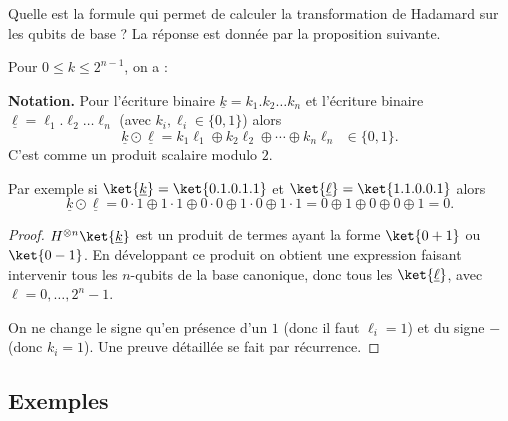 \documentclass[11pt,class=report,crop=false]{standalone}
\begin{document}
Quelle est la formule qui permet de calculer la transformation de Hadamard sur les qubits de base ?
La réponse est donnée par la proposition suivante.

\begin{proposition}
Pour $0 \le k \le 2^{n-1}$, on a :
\end{proposition}

\textbf{Notation.}
Pour l'écriture binaire $\underline{k} = k_1.k_2 \ldots k_n$ et l'écriture binaire
$\underline{\ell} = \ell_1.\ell_2 \ldots \ell_n$ (avec $k_i,\ell_i \in \{0,1\}$) alors
$$\underline{k} \odot \underline{\ell} = k_1\ell_1 \oplus k_2\ell_2 \oplus \cdots \oplus k_n \ell_n \ \ \in \{0,1\}.$$
C'est comme un produit scalaire modulo $2$.

Par exemple si $\ket{\underline{k}} = \ket{0.1.0.1.1}$ et $\ket{\underline\ell} = \ket{1.1.0.0.1}$ alors 
$$\underline{k} \odot \underline{\ell} = 0\cdot1 \oplus 1\cdot1 \oplus 0\cdot0 \oplus 1\cdot 0 \oplus 1\cdot 1 = 0 \oplus 1 \oplus 0 \oplus 0 \oplus 1 = 0.$$

\begin{proof}
$H^{\otimes n} \ket{\underline{k}}$ est un produit de termes ayant la forme $\ket{0+1}$ ou $\ket{0-1}$.
En développant ce produit on obtient une expression faisant intervenir tous les $n$-qubits de la base canonique, donc tous les $\ket{\underline{\ell}}$, avec $\ell=0,\ldots,2^n-1$.

On ne change le signe qu'en présence d'un $1$ (donc il faut $\ell_i=1$) et du signe \og{}$-$\fg{} (donc $k_i=1$).
Une preuve détaillée se fait par récurrence.
\end{proof}


\subsection{Exemples}
\end{document}
